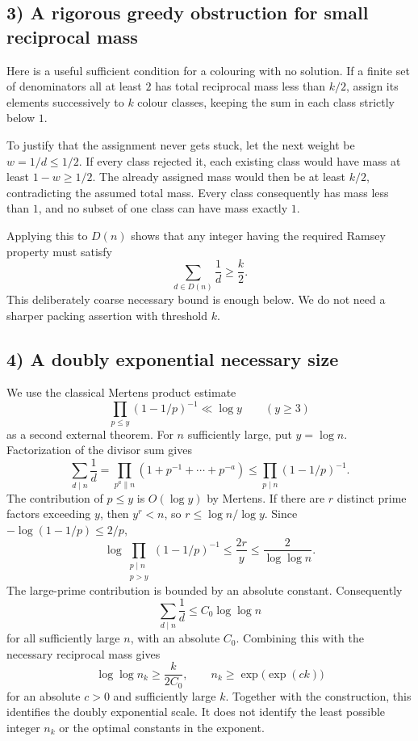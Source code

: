 \subsection{3) A rigorous greedy obstruction for small reciprocal mass}
Here is a useful sufficient condition for a colouring with no solution.
If a finite set of denominators all at least $2$ has total reciprocal
mass less than $k/2$, assign its elements successively to $k$ colour
classes, keeping the sum in each class strictly below $1$.

To justify that the assignment never gets stuck, let the next weight
be $w=1/d\leq1/2$. If every class rejected it, each existing class
would have mass at least $1-w\geq1/2$. The already assigned mass
would then be at least $k/2$, contradicting the assumed total mass.
Every class consequently has mass less than $1$, and no subset of
one class can have mass exactly $1$.

Applying this to $D(n)$ shows that any integer having the required
Ramsey property must satisfy
\[
 \sum_{d\in D(n)}\frac1d\geq\frac k2.
\]
This deliberately coarse necessary bound is enough below. We do not
need a sharper packing assertion with threshold $k$.

\subsection{4) A doubly exponential necessary size}
We use the classical Mertens product estimate
\[
 \prod_{p\leq y}(1-1/p)^{-1}\ll\log y\qquad(y\geq3)
\]
as a second external theorem. For $n$ sufficiently large, put
$y=\log n$. Factorization of the divisor sum gives
\[
 \sum_{d\mid n}\frac1d
 =\prod_{p^a\parallel n}(1+p^{-1}+\cdots+p^{-a})
 \leq\prod_{p\mid n}(1-1/p)^{-1}.
\]
The contribution of $p\leq y$ is $O(\log y)$ by Mertens.
If there are $r$ distinct prime factors exceeding $y$, then
$y^r<n$, so $r\leq\log n/\log y$. Since
$-\log(1-1/p)\leq2/p$,
\[
 \log\prod_{\substack{p\mid n\\p>y}}(1-1/p)^{-1}
 \leq\frac{2r}{y}
 \leq\frac{2}{\log\log n}.
\]
The large-prime contribution is bounded by an absolute constant.
Consequently
\[
 \sum_{d\mid n}\frac1d\leq C_0\log\log n
\]
for all sufficiently large $n$, with an absolute $C_0$.
Combining this with the necessary reciprocal mass gives
\[
 \log\log n_k\geq\frac{k}{2C_0},\qquad
 n_k\geq\exp\bigl(\exp(c k)\bigr)
\]
for an absolute $c>0$ and sufficiently large $k$.
Together with the construction, this identifies the doubly exponential
scale. It does not identify the least possible integer $n_k$ or the
optimal constants in the exponent.

